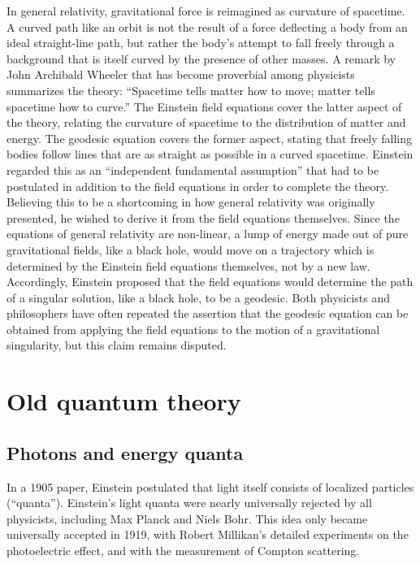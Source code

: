 \documentclass[twoside]{memoir}
\begin{document}
In general relativity, gravitational force  is reimagined as curvature of spacetime. A curved path like an orbit is not the result of a force deflecting a body from an ideal straight-line path, but rather the body's attempt to fall freely through a background that is itself curved by the presence of other masses. A remark by John Archibald Wheeler that has become proverbial among physicists summarizes the theory: \enquote{Spacetime tells matter how to move; matter tells spacetime how to curve.}\cite{Kersting_2019} The Einstein field equations cover the latter aspect of the theory, relating the curvature of spacetime to the distribution of matter and energy. The geodesic equation covers the former aspect, stating that freely falling bodies follow lines that are as straight as possible in a curved spacetime. Einstein regarded this as an \enquote{independent fundamental assumption} that had to be postulated in addition to the field equations in order to complete the theory. Believing this to be a shortcoming in how general relativity was originally presented, he wished to derive it from the field equations themselves. Since the equations of general relativity are non-linear, a lump of energy made out of pure gravitational fields, like a black hole, would move on a trajectory which is determined by the Einstein field equations themselves, not by a new law. Accordingly, Einstein proposed that the field equations would determine the path of a singular solution, like a black hole, to be a geodesic. Both physicists and philosophers have often repeated the assertion that the geodesic equation can be obtained from applying the field equations to the motion of a gravitational singularity, but this claim remains disputed.\cite{Tamir_2012,Malament_2012}

\chapter{Old quantum theory}\label{old-quantum-theory}

\section{Photons and energy quanta}\label{photons-and-energy-quanta}

In a 1905 paper, Einstein postulated that light itself consists of localized particles (\enquote{quanta}). Einstein's light quanta were nearly universally rejected by all physicists, including Max Planck  and Niels Bohr.  This idea only became universally accepted in 1919, with Robert Millikan's detailed experiments on the photoelectric effect, and with the measurement of Compton scattering.
\end{document}
